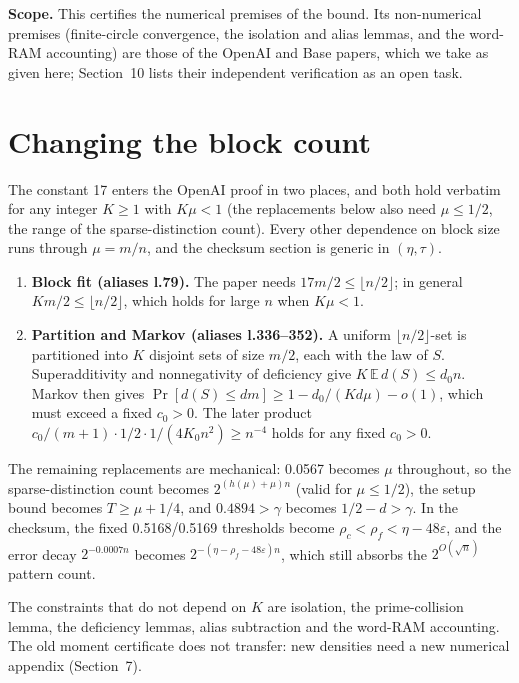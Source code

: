 \documentclass[11pt]{article}
\newcommand{\E}{\mathbb{E}}
\newcommand{\eps}{\varepsilon}
\theoremstyle{plain}
\begin{document}
\textbf{Scope.} This certifies the numerical premises of the bound. Its non-numerical premises (finite-circle convergence, the isolation and alias lemmas, and the word-RAM accounting) are those of the OpenAI and Base papers, which we take as given here; Section~10 lists their independent verification as an open task.

\section{Changing the block count}

The constant 17 enters the OpenAI proof in two places, and both hold verbatim for any integer $K \ge 1$ with $K\mu < 1$ (the replacements below also need $\mu \le 1/2$, the range of the sparse-distinction count). Every other dependence on block size runs through $\mu = m/n$, and the checksum section is generic in $(\eta, \tau)$.

\begin{enumerate}
\item \textbf{Block fit (aliases l.79).} The paper needs $17 m/2 \le \lfloor n/2 \rfloor$; in general $K m/2 \le \lfloor n/2 \rfloor$, which holds for large $n$ when $K\mu < 1$.
\item \textbf{Partition and Markov (aliases l.336--352).} A uniform $\lfloor n/2 \rfloor$-set is partitioned into $K$ disjoint sets of size $m/2$, each with the law of $S$. Superadditivity and nonnegativity of deficiency give $K\, \E\, d(S) \le d_0 n$. Markov then gives $\Pr[d(S) \le d m] \ge 1 - d_0/(K d \mu) - o(1)$, which must exceed a fixed $c_0 > 0$. The later product $c_0/(m+1) \cdot 1/2 \cdot 1/(4 K_0 n^2) \ge n^{-4}$ holds for any fixed $c_0 > 0$.
\end{enumerate}

The remaining replacements are mechanical: 0.0567 becomes $\mu$ throughout, so the sparse-distinction count becomes $2^{(h(\mu)+\mu)n}$ (valid for $\mu \le 1/2$), the setup bound becomes $T \ge \mu + 1/4$, and $0.4894 > \gamma$ becomes $1/2 - d > \gamma$. In the checksum, the fixed 0.5168/0.5169 thresholds become $\rho_c < \rho_f < \eta - 48\eps$, and the error decay $2^{-0.0007n}$ becomes $2^{-(\eta - \rho_f - 48\eps)n}$, which still absorbs the $2^{O(\sqrt{n})}$ pattern count.

The constraints that do not depend on $K$ are isolation, the prime-collision lemma, the deficiency lemmas, alias subtraction and the word-RAM accounting. The old moment certificate does not transfer: new densities need a new numerical appendix (Section~7).
\end{document}
